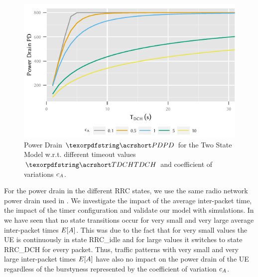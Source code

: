 \begin{figure}
	\centering
	\includegraphics{network/performance_model/numerical_examples/figures/2state_tdch_pd}
	\caption{Power Drain \(\headershortacr{PD}\) for the Two State Model w.r.t. different timeout values \(\headershortacr{TDCH}\) and coefficient of variations \(c_{A}\).}
	\label{fig:network:performance_model:numerical_examples:validations:analytic_vs_simulation:2state_tdch_pd}
\end{figure}

For the power drain in the different \gls{RRC} states, we use the same radio network power drain  used in .
We investigate the impact of the average inter-packet time, the impact of the timer configuration and validate our model with simulations. 
In  we have seen that no state transitions occur for very small and very large average inter-packet times \(E[A]\).
This was due to the fact that for very small values the \gls{UE} is continuously in state \gls{RRC_idle} and for large values it switches to state \gls{RRC_DCH} for every packet.
Thus, traffic patterns with very small and very large inter-packet times \(E[A]\) have also no impact on the power drain of the \gls{UE} regardless of the burstyness represented by the coefficient of variation \(c_{A}\).

